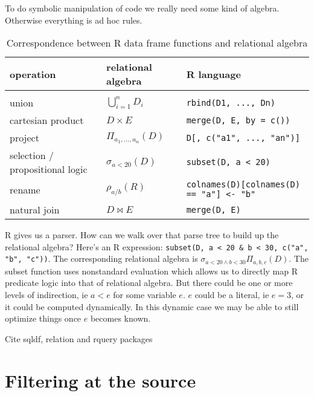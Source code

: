 \documentclass[12pt]{article}
\begin{document}
To do symbolic manipulation of code we really need some kind of algebra.
Otherwise everything is ad hoc rules.



\begin{table}[]
\centering
    \caption{Correspondence between R data frame functions and relational
    algebra}
\label{tab-correspond}
\begin{tabular}{lll}
    \textbf{operation} & \textbf{relational algebra} & \textbf{R language}
    \\
\hline
    \\ union  & $\bigcup_{i=1}^n D_i$
        & \texttt{rbind(D1, ..., Dn)}
    \\ cartesian product   & $D \times E$
        & \texttt{merge(D, E, by = c())}
    \\ project & $\Pi _{a_{1},\ldots ,a_{n}}(D)$
        & \texttt{D[, c("a1", ..., "an")]}
    \\ selection / propositional logic & $\sigma_{a < 20} (D)$
        & \texttt{subset(D, a < 20)}
    \\ rename & $\rho_{a / b}(R)$
        & \texttt{colnames(D)[colnames(D) == "a"] <- "b"}
    \\ natural join & $D \Join E$
        & \texttt{merge(D, E)}
\end{tabular}
\end{table}

R gives us a parser. How can we walk over that parse tree to build up the
relational algebra? Here's an R expression: 
\verb$subset(D, a < 20 & b < 30, c("a", "b", "c"))$.
The corresponding relational algebra is $\sigma_{a < 20 \wedge b < 30} \Pi _{a,
b, c} (D)$. The subset function uses nonstandard evaluation which allows us
to directly map R predicate logic into that of relational algebra. But
there could be one or more levels of indirection, ie $a < e$ for some
variable $e$. $e$ could be a literal, ie $e = 3$, or it could be computed
dynamically. In this dynamic case we may be able to still optimize things
once $e$ becomes known.

Cite sqldf, relation and rquery packages


\section{Filtering at the source}
\end{document}
